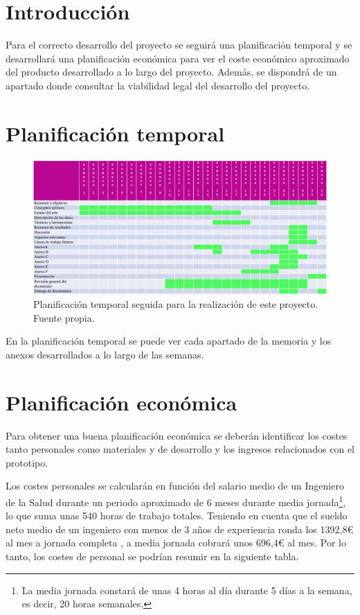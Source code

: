 
\section{Introducción}
Para el correcto desarrollo del proyecto se seguirá una planificación temporal y se desarrollará una planificación económica para ver el coste económico aproximado del producto desarrollado a lo largo del proyecto. Además, se dispondrá de un apartado donde consultar la viabilidad legal del desarrollo del proyecto.

\section{Planificación temporal}
\begin{figure}[h]
    \centering
    \includegraphics[width=1\textwidth]{img/PlanificacionTemporal.png}
    \caption{Planificación temporal seguida para la realización de este proyecto.  Fuente propia.}
    \label{fig:planTemporal} 
\end{figure}

En la planificación temporal se puede ver cada apartado de la memoria y los anexos desarrollados a lo largo de las semanas. 

\section{Planificación económica}

Para obtener una buena planificación económica se deberán identificar los costes tanto personales como materiales y de desarrollo y los ingresos relacionados con el prototipo.

Los costes personales se calcularán en función del salario medio de un Ingeniero de la Salud durante un periodo aproximado de 6 meses durante media jornada\footnote{La media jornada constará de unas 4 horas al día durante 5 días a la semana, es decir, 20 horas semanales.}, lo que suma unas 540 horas de trabajo totales. Teniendo en cuenta que el sueldo neto medio de un ingeniero con menos de 3 años de experiencia ronda los 1392,8€ al mes a jornada completa \cite{SueldoBruto}, a media jornada cobrará unos 696,4€ al mes. Por lo tanto, los costes de personal se podrían resumir en la siguiente tabla.

